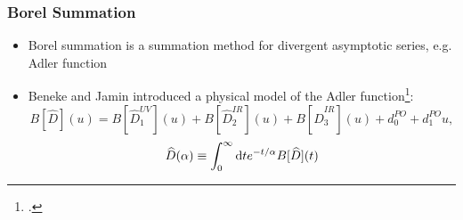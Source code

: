 \documentclass{beamer}
\begin{document}
\begin{frame}
  \frametitle{Borel Summation}
  \begin{itemize}
  \item Borel summation is a summation method for divergent asymptotic series,
    e.g. Adler function
  \item Beneke and Jamin introduced a physical model of the Adler function\footcite{Beneke2008}:
    \begin{equation}
      \label{eq:borelModel}
      B[\widehat D](u) = B[\widehat D_1^{UV}](u) + B[\widehat D_2^{IR}](u) + B[\widehat D_3^{IR}](u) + d_0^{PO} + d_1^{PO}u,
    \end{equation}
    \begin{equation}
      \widehat D(\alpha) \equiv \int_0^\infty \dif t e^{-t/\alpha} B[\widehat D](t)
    \end{equation}
  \end{itemize}
\end{frame}
\end{document}
